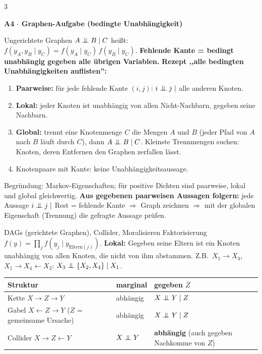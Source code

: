 \documentclass[8pt,a4paper,landscape]{extarticle}
\renewcommand{\arraystretch}{1.12}
\newcommand{\sect}[1]{\par\vspace{1pt}%
  {\fontsize{10}{11}\selectfont\bfseries #1}\par\nobreak\vspace{1pt}\nobreak}
\newcommand{\indep}{\mathrel{\perp\mkern-10mu\perp}}
\newcommand{\ra}{$\Rightarrow$}
\begin{document}
\begin{multicols*}{3}
\sect{A4 $\cdot$ Graphen-Aufgabe (bedingte Unabhängigkeit)}
\begin{wissen}{Ungerichtete Graphen}
$A\indep B\mid C$ heißt: $f(y_A,y_B\mid y_C)=f(y_A\mid y_C)\,f(y_B\mid y_C)$. \textbf{Fehlende Kante = bedingt unabhängig gegeben alle übrigen Variablen.}
\textbf{Rezept ,,alle bedingten Unabhängigkeiten auflisten'':}
\begin{enumerate}[leftmargin=10pt]
\item \textbf{Paarweise:} für jede fehlende Kante $(i,j)$: $i\indep j\mid$ alle anderen Knoten.
\item \textbf{Lokal:} jeder Knoten ist unabhängig von allen Nicht-Nachbarn, gegeben seine Nachbarn.
\item \textbf{Global:} trennt eine Knotenmenge $C$ die Mengen $A$ und $B$ (jeder Pfad von $A$ nach $B$ läuft durch $C$), dann $A\indep B\mid C$. Kleinste Trennmengen suchen: Knoten, deren Entfernen den Graphen zerfallen lässt.
\item Knotenpaare mit Kante: keine Unabhängigkeitsaussage.
\end{enumerate}
Begründung: Markov-Eigenschaften; für positive Dichten sind paarweise, lokal und global gleichwertig.
\textbf{Aus gegebenen paarweisen Aussagen folgern:} jede Aussage $i\indep j\mid$ Rest = fehlende Kante \ra{} Graph zeichnen \ra{} mit der globalen Eigenschaft (Trennung) die gefragte Aussage prüfen.
\end{wissen}
\begin{wissen}{DAGs (gerichtete Graphen), Collider, Moralisieren}
Faktorisierung $f(y)=\prod_j f(y_j\mid y_{\text{Eltern}(j)})$. \textbf{Lokal:} Gegeben seine Eltern ist ein Knoten unabhängig von allen Knoten, die nicht von ihm abstammen. Z.B.\ $X_1\to X_3$, $X_1\to X_4\leftarrow X_2$: $X_3\indep\{X_2,X_4\}\mid X_1$.
{\renewcommand{\arraystretch}{1.05}\begin{tabularx}{\linewidth}{@{}>{\raggedright\arraybackslash}p{2.9cm}>{\raggedright\arraybackslash}p{1.45cm}>{\raggedright\arraybackslash}X@{}}
Struktur & marginal & gegeben $Z$ \\
\hline
Kette $X\to Z\to Y$ & abhängig & $X\indep Y\mid Z$ \\
Gabel $X\leftarrow Z\to Y$ ($Z$ = gemeinsame Ursache) & abhängig & $X\indep Y\mid Z$ \\
Collider $X\to Z\leftarrow Y$ & $X\indep Y$ & \textbf{abhängig} (auch gegeben Nachkomme von $Z$) \\
\end{tabularx}}

\end{wissen}
\end{multicols*}
\end{document}
